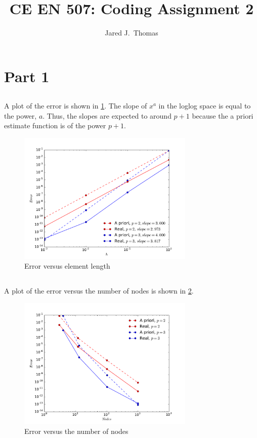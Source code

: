 \documentclass{article}
\title{CE EN 507: Coding Assignment 2}
\author{ Jared J.~Thomas}
\begin{document}
\maketitle

\section{Part 1}

\subsection{}
A plot of the error is shown in \cref{fig:11}. The slope of $x^a$ in the loglog space is equal to the power, $a$. Thus, the slopes are expected to around $p+1$ because the a priori estimate function is of the power $p+1$.
\begin{figure}[ht]
	\centering
	\includegraphics[width=0.75\textwidth]{error_he}
	\caption{Error versus element length}
	\label{fig:11}
\end{figure}

\subsection{}
A plot of the error versus the number of nodes is shown in \cref{fig:12}.
\begin{figure}[ht]
	\centering
	\includegraphics[width=0.75\textwidth]{error_nodes}
	\caption{Error versus the number of nodes}
	\label{fig:12}
\end{figure}
\end{document}
